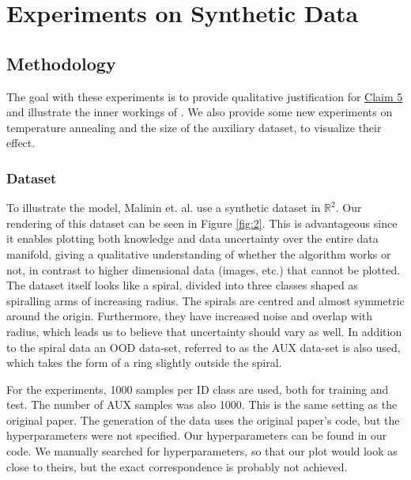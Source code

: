 \FloatBarrier
\section{Experiments on Synthetic Data}
\label{sec:experiments-on-synthetic-data}

\subsection{Methodology}

The goal with these experiments is to provide qualitative justification for \hyperlink{claim5}{Claim 5} and illustrate the inner workings of \EnDD. We also provide some new experiments on temperature annealing and the size of the auxiliary dataset, to visualize their effect. 

\subsubsection{Dataset}

To illustrate the model, Malinin et. al. use a synthetic dataset in $\mathbb{R}^2$. Our rendering of this dataset can be seen in Figure \ref{fig:2}. This is advantageous since it enables plotting both knowledge and data uncertainty over the entire data manifold, giving a qualitative understanding of whether the algorithm works or not, in contrast to higher dimensional data (images, etc.) that cannot be plotted. The dataset itself looks like a spiral, divided into three classes shaped as spiralling arms of increasing radius. The spirals are centred and almost symmetric around the origin. Furthermore, they have increased noise and overlap with radius, which leads us to believe that uncertainty should vary as well. In addition to the spiral data an OOD data-set, referred to as the AUX data-set is also used, which takes the form of a ring slightly outside the spiral.

For the experiments, 1000 samples per ID class are used, both for training and test. The number of AUX samples was also 1000. This is the same setting as the original paper. The generation of the data uses the original paper's code, but the hyperparameters were not specified. Our hyperparameters can be found in our code. We manually searched for hyperparameters, so that our plot would look as close to theirs, but the exact correspondence is probably not achieved. 

